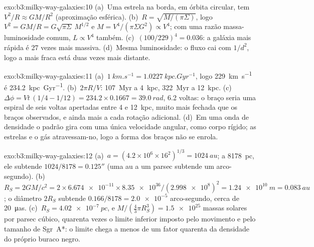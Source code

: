\begin{solution}{exo:b3:milky-way-galaxies:10}
(a)~Uma estrela na borda, em órbita circular, tem $V^2/R \approx GM/R^2$
(aproximação esférica). (b)~$R = \sqrt{M/(\pi\Sigma)}$, logo $V^2 =
GM/R = G\sqrt{\pi\Sigma}\,M^{1/2}$ e $M = V^4/(\pi\Sigma G^2) \propto
V^4$; com uma razão massa-luminosidade comum, $L \propto V^4$ também.
(c)~$(100/229)^4 = \num{0.036}$: a galáxia mais rápida é 27 vezes mais
massiva. (d)~Mesma luminosidade: o fluxo cai com $1/d^2$, logo a mais fraca
está duas vezes mais distante.
\end{solution}

\begin{solution}{exo:b3:milky-way-galaxies:11}
(a)~$\qty{1}{km.s^{-1}} = \qty{1.0227}{kpc.Gyr^{-1}}$, logo
\qty{229}{km.s^{-1}} é \qty{234.2}{kpc.Gyr^{-1}}. (b)~$2\pi R/V$:
\qty{107}{Myr} a \qty{4}{kpc}, \qty{322}{Myr} a \qty{12}{kpc}.
(c)~$\Delta\phi = Vt\,(1/4 - 1/12) = 234.2\times0.1667 = \qty{39.0}{rad}$,
6.2 voltas: o braço seria uma espiral de seis voltas apertadas entre 4 e
\qty{12}{kpc}, muito mais fechada que os braços observados, e ainda mais a cada
rotação adicional. (d)~Em uma onda de densidade o padrão gira com uma única
velocidade angular, como corpo rígido; as estrelas e o gás atravessam-no, logo a forma
dos braços não se enrola.
\end{solution}

\begin{solution}{exo:b3:milky-way-galaxies:12}
(a)~$a = (4.2\times10^6\times16^2)^{1/3} = \qty{1024}{au}$; a
\qty{8178}{pc}, ele subtende $1024/8178 = \ang{;;0.125}$ (uma au a um parsec
subtende um arco-segundo). (b)~$R_S = 2GM/c^2 = 2\times\num{6.674e-11}
\times\num{8.35e36}/(\num{2.998e8})^2 = \qty{1.24e10}{m} = \qty{0.083}{au}$;
o diâmetro $2R_S$ subtende $0.166/8178 = \num{2.0e-5}$ arco-segundo, cerca de
\qty{20}{\micro as}. (c)~$R_S = \qty{4.02e-7}{pc}$, e $M/(\tfrac43\pi
R_S^3) = \num{1.5e25}$ massas solares por parsec cúbico, quarenta vezes o
limite inferior imposto pelo movimento e pelo tamanho de Sgr~A*: o limite chega
a menos de um fator quarenta da densidade do próprio buraco negro.
\end{solution}


